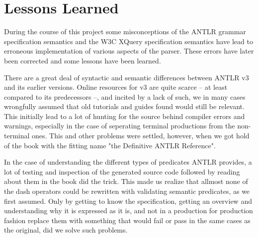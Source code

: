 \section{Lessons Learned}
\label{sect:discussion:deadEnds}
During the course of this project some misconceptions of the ANTLR grammar
specification semantics and the W3C XQuery specification semantics have lead to
erroneous implementation of various aspects of the parser. These errors have
later been corrected and some lessons have been learned.   

There are a great deal of syntactic and semantic differences between ANTLR v3
and its earlier versions. Online resources for v3 are quite scarce -- at least
compared to its predecessors --, and incited by a lack of such, we in many
cases wrongfully assumed that old tutorials and guides found would still be
relevant. This initially lead to a lot of hunting for the source behind compiler
errors and warnings, especially in the case of seperating terminal productions
from the non-terminal ones. This and other problems were settled, however, when
we got hold of the book with the fitting name "the Definitive ANTLR
Reference"\cite{definitiveAntlr}.

In the case of understanding the different types of predicates ANTLR provides,
a lot of testing and inspection of the generated source code followed by
reading about them in the book did the trick. This made us realize that allmost
none of the dash operators could be rewritten with validating semantic
predicates, as we first assumed. Only by getting to know the specification,
getting an overview and understanding why it is expressed as it is, and not in
a production for production fashion replace them with something that would fail
or pass in the same cases as the original, did we solve such problems.
